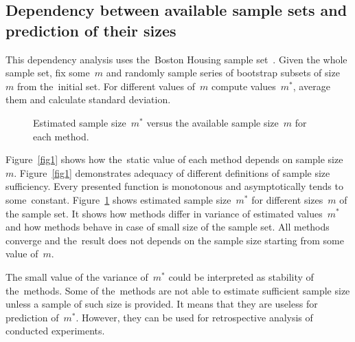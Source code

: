\documentclass[
11pt,%
tightenlines,%
twoside,%
onecolumn,%
nofloats,%
nobibnotes,%
nofootinbib,%
superscriptaddress,%
noshowpacs,%
centertags]%
{revtex4}
\begin{document}
\subsection{Dependency between available sample sets and prediction of their sizes}

This dependency analysis uses the~Boston Housing sample
set~\cite{boston}.  Given the whole sample set, fix some~$m$ and
randomly sample series of bootstrap subsets of size~$m$ from
the~initial set. For different values of~$m$ compute values~$m^*$,
average them and calculate standard deviation.

\begin{figure}[!htp]
 \caption{Estimated sample size~$m^*$ versus the available sample size~$m$ for each method.}
\label{fig2}
\end{figure}

Figure~\ref{fig1} shows how the~static value of each method depends on sample size~$m$. %
Figure~\ref{fig1} demonstrates adequacy of different definitions of
sample size sufficiency.  Every presented function is monotonous and
asymptotically tends to some~constant. Figure~\ref{fig2} shows
estimated sample size~$m^*$ for  different sizes~$m$ of the sample
set. It shows how methods differ in variance  of estimated
values~$m^*$ and how methods behave in case of small size of the
sample set. All methods converge and the~result does not depends on
the sample size starting from some value of~$m$.



The small value of the variance of~$m^*$ could be interpreted as stability of the~methods.
Some of the~methods are not able to estimate sufficient sample size
unless a sample of   such size is provided. It means that they are
useless for prediction of~$m^*$. However, they can be used for
retrospective analysis of conducted experiments.
\end{document}

